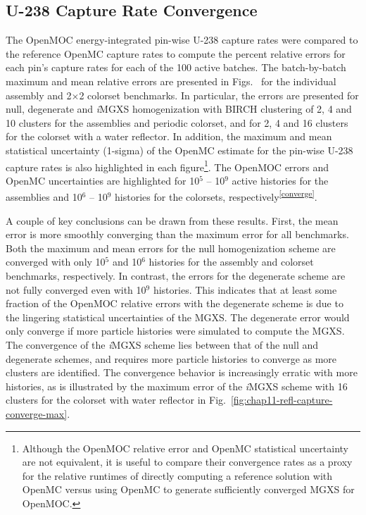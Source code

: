 \subsection{U-238 Capture Rate Convergence}
\label{subsec:chap11-capture-converge}

The OpenMOC energy-integrated pin-wise U-238 capture rates were compared to the reference OpenMC capture rates to compute the percent relative errors for each pin's capture rates for each of the 100 active batches. The batch-by-batch maximum and mean relative errors are presented in Figs.~ for the individual assembly and 2$\times$2 colorset benchmarks. In particular, the errors are presented for null, degenerate and \textit{i}\ac{MGXS} homogenization with BIRCH clustering of 2, 4 and 10 clusters for the assemblies and periodic colorset, and for 2, 4 and 16 clusters for the colorset with a water reflector. In addition, the maximum and mean statistical uncertainty (1-sigma) of the OpenMC estimate for the pin-wise U-238 capture rates is also highlighted in each figure\footnote{Although the OpenMOC relative error and OpenMC statistical uncertainty are not equivalent, it is useful to compare their convergence rates as a proxy for the relative runtimes of directly computing a reference solution with OpenMC versus using OpenMC to generate sufficiently converged \ac{MGXS} for OpenMOC.}. The OpenMOC errors and OpenMC uncertainties are highlighted for 10$^{5}$ -- 10$^{9}$ active histories for the assemblies and 10$^{6}$ -- 10$^{9}$ histories for the colorsets, respectively\textsuperscript{\ref{converge}}.


A couple of key conclusions can be drawn from these results. First, the mean error is more smoothly converging than the maximum error for all benchmarks. Both the maximum and mean errors for the null homogenization scheme are converged with only 10$^{5}$ and 10$^{6}$ histories for the assembly and colorset benchmarks, respectively. In contrast, the errors for the degenerate scheme are not fully converged even with 10$^{9}$ histories. This indicates that at least some fraction of the OpenMOC relative errors with the degenerate scheme is due to the lingering statistical uncertainties of the \ac{MGXS}. The degenerate error would only converge if more particle histories were simulated to compute the \ac{MGXS}. The convergence of the \textit{i}\ac{MGXS} scheme lies between that of the null and degenerate schemes, and requires more particle histories to converge as more clusters are identified. The convergence behavior is increasingly erratic with more histories, as is illustrated by the maximum error of the \textit{i}\ac{MGXS} scheme with 16 clusters for the colorset with water reflector in Fig.~\ref{fig:chap11-refl-capture-converge-max}.

